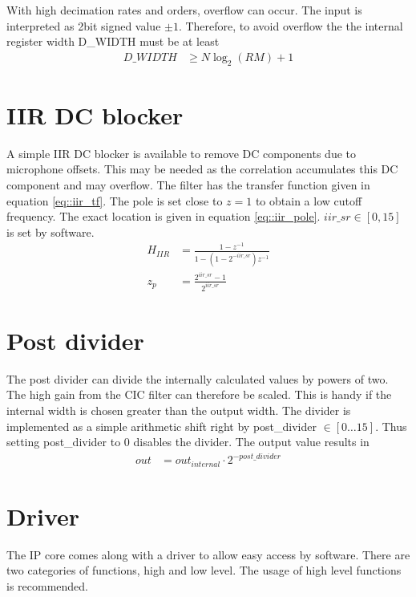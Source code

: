 With high decimation rates and orders, overflow can occur.
The input is interpreted as 2bit signed value $\pm1$. 
Therefore, to avoid overflow the the internal register width D\_WIDTH must be at least
\begin{align}
D\_WIDTH &\ge N\log_2{(RM)} + 1 \label{eq::cic_width}
\end{align}

\section{IIR DC blocker}
\label{sec::iir}
A simple IIR DC blocker is available to remove DC components due to microphone offsets.
This may be needed as the correlation accumulates this DC component and may overflow.
The filter has the transfer function given in equation \ref{eq::iir_tf}.
The pole is set close to $z=1$ to obtain a low cutoff frequency.
The exact location is given in equation \ref{eq::iir_pole}.
$iir\_sr\in\left[0,15\right]$ is set by software.
\begin{align}
	H_{IIR} &= \frac{1-z^{-1}}{1-\left(1-2^{-iir\_sr}\right)z^{-1}} \label{eq::iir_tf}\\
	z_p &= \frac{2^{iir\_sr}-1}{2^{iir\_sr}} \label{eq::iir_pole}
\end{align}

\section{Post divider}
\label{sec::post_divider}

The post divider can divide the internally calculated values by powers of two.
The high gain from the CIC filter can therefore be scaled.
This is handy if the internal width is chosen greater than the output width.
The divider is implemented as a simple arithmetic shift right by post\_divider $\in\left[0\ldots15\right]$.
Thus setting post\_divider to 0 disables the divider.
The output value results in
\begin{align}
	out &= out_{internal}\cdot2^{-post\_divider}
\end{align}

\section{Driver}
\label{sec::driver}

The IP core comes along with a driver to allow easy access by software.
There are two categories of functions, high and low level.
The usage of high level functions is recommended.

